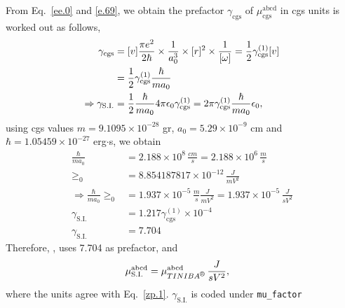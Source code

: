 \documentclass[12pt]{article}
\numberwithin{equation}{section}
\begin{document}
\begin{enumerate}
From 
Eq.~\eqref{ee.0} and \eqref{e.69}, we obtain the prefactor $\gamma_{\mathrm{cgs}}$ of 
$\mu^{\mathrm{abcd}}_{\mathrm{cgs}}$ in 
 cgs  units is worked out as follows, 
\begin{align}\label{e.4c}
\gamma_{\mathrm{cgs}}
&=[v]
\frac{\pi e^2}{2\hbar}\times\frac{1}{a^3_0}\times[r]^2\times\frac{1}{[\omega]}
=\frac{1}{2}
\gamma^{(1)}_{\mathrm{cgs}}
[v]
\nonumber\\
&
=\frac{1}{2}
\gamma^{(1)}_{\mathrm{cgs}}
\frac{\hbar}{ma_0}
\nonumber\\
\Rightarrow 
\gamma_{\mathrm{S.I.}} &=
\frac{1}{2}\frac{\hbar}{ma_0}
 4\pi\epsilon_0\gamma^{(1)}_{\mathrm{cgs}} 
=2\pi\gamma^{(1)}_{\mathrm{cgs}}  \frac{\hbar}{ma_0}
\epsilon_0 
,
\end{align} 
using cgs values $m=9.1095\times 10^{-28}$ gr,
$a_0=5.29\times 10^{-9}$ cm 
and $\hbar=1.05459\times 10^{-27}$ erg$\cdot$s, we obtain 
\begin{align}\label{e.5n}
\frac{\hbar}{ma_0}
&=2.188\times 10^{8}\,\frac{cm}{s}
=2.188\times 10^{6}\,\frac{m}{s}
\nonumber\\
\ge_0&=8.854187817\times 10^{-12}\,\frac{J}{mV^2}
\nonumber\\
\Rightarrow 
\frac{\hbar}{ma_0}
\ge_0&=1.937\times 10^{-5}\,\frac{m}{s}\frac{J}{mV^2}
=1.937\times 10^{-5}\,\frac{J}{sV^2}
\nonumber\\
\gamma_{\mathrm{S.I.}} &=
1.217 
\gamma^{(1)}_{\mathrm{cgs}}\times 10^{-4} 
\nonumber\\
\gamma_{\mathrm{S.I.}} &=
7.704
\end{align}
Therefore, \tiniba, uses 7.704 as prefactor, and 
\begin{align}\label{e.6}
\mu^{\mathrm{abcd}}_{\mathrm{S.I.}}&=
\mu^{\mathrm{abcd}}_{\tiniba}\,\frac{J}{sV^2}
,
\end{align} 
where the units agree with Eq.~\eqref{zp.1}.
$\gamma_{\mathrm{S.I.}}$ is coded under \verb=mu_factor=


\end{enumerate}
\end{document}
